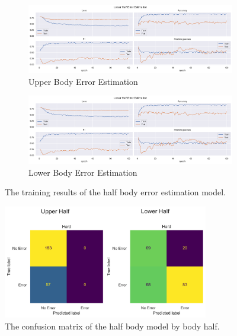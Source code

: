 \begin{figure}[ht]
  \centering
  \begin{subfigure}[b]{0.8\textwidth}
      \centering
      \includegraphics[width=\textwidth]{figures/Results/v2_bs_40_is_64_e_100/hb/UpperBody_HalfBodyErrorEstimation.png}
      \caption{Upper Body Error Estimation}
      \label{fig:uh_ee}
  \end{subfigure}
  \hfill
  \begin{subfigure}[b]{0.8\textwidth}
      \centering
      \includegraphics[width=\textwidth]{figures/Results/v2_bs_40_is_64_e_100/hb/LowerBody_ErrorEstimation_uh.png}
      \caption{Lower Body Error Estimation}
      \label{fig:lh_ee}
  \end{subfigure}
  \caption[Half Body model training results]{The training results of the half body error estimation model.}
     \label{fig:half_body_training_results}
\end{figure}

\begin{figure}[ht]
  \centering
  \includegraphics[width=0.8\textwidth]{figures/Results/v2_bs_40_is_64_e_100/confusion/half_halves.png}
  \caption[half Body Confusion Matrix by Body Half]{The confusion matrix of the half body model by body half.}
  \label{fig:conf_v2_hb}
\end{figure}

